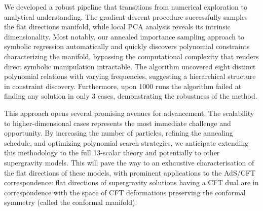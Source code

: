 \documentclass[11pt,a4paper]{article}
\begin{document}
We developed a robust pipeline that transitions from numerical exploration to analytical understanding. The gradient descent procedure successfully samples the flat directions manifold, while local PCA analysis reveals its intrinsic dimensionality. Most notably, our annealed importance sampling approach to symbolic regression automatically and quickly discovers polynomial constraints characterizing the manifold, bypassing the computational complexity that renders direct symbolic manipulation intractable. The algorithm uncovered eight distinct polynomial relations with varying frequencies, suggesting a hierarchical structure in constraint discovery. Furthermore, upon 1000 runs the algorithm failed at finding any solution in only 3 cases, demonstrating the robustness of the method. 

This approach opens several promising avenues for advancement. The scalability to higher-dimensional cases represents the most immediate challenge and opportunity. By increasing the number of particles, refining the annealing schedule, and optimizing polynomial search strategies, we anticipate extending this methodology to the full 13-scalar theory and potentially to other supergravity models. This will pave the way to an exhaustive characterisation of the flat directions of these models, with prominent applications to the AdS/CFT correspondence: flat directions of supergravity solutions having a CFT dual are in correspondence with the space of CFT deformations preserving the conformal symmetry (called the conformal manifold). 

\end{document}
